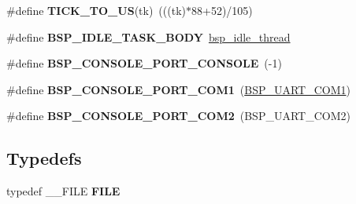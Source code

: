 \begin{DoxyCompactItemize}
\#define {\bfseries T\+I\+C\+K\+\_\+\+T\+O\+\_\+\+US}(tk)~(((tk)$\ast$88+52)/105)
\item 
\mbox{\label{group__RTEMSBSPsI386_ga4aa606d0badadcc28e8054cb60f13b56}} 
\#define {\bfseries B\+S\+P\+\_\+\+I\+D\+L\+E\+\_\+\+T\+A\+S\+K\+\_\+\+B\+O\+DY}~\mbox{\hyperlink{group__RTEMSBSPsSPARCLEON3_ga301be7085b80c41a9c5887247003c662}{bsp\+\_\+idle\+\_\+thread}}
\item 
\mbox{\label{group__RTEMSBSPsI386_gaab0a143e4bea132132a48752eed25bfb}} 
\#define {\bfseries B\+S\+P\+\_\+\+C\+O\+N\+S\+O\+L\+E\+\_\+\+P\+O\+R\+T\+\_\+\+C\+O\+N\+S\+O\+LE}~(-\/1)
\item 
\mbox{\label{group__RTEMSBSPsI386_ga522f9084a539a2ceeaa2070d41dc47a3}} 
\#define {\bfseries B\+S\+P\+\_\+\+C\+O\+N\+S\+O\+L\+E\+\_\+\+P\+O\+R\+T\+\_\+\+C\+O\+M1}~(\mbox{\hyperlink{group__i386__uart_gaa1561064cc8499388f7512347b434d25}{B\+S\+P\+\_\+\+U\+A\+R\+T\+\_\+\+C\+O\+M1}})
\item 
\mbox{\label{group__RTEMSBSPsI386_ga4c125f964575bd480c657bd5825de3f2}} 
\#define {\bfseries B\+S\+P\+\_\+\+C\+O\+N\+S\+O\+L\+E\+\_\+\+P\+O\+R\+T\+\_\+\+C\+O\+M2}~(B\+S\+P\+\_\+\+U\+A\+R\+T\+\_\+\+C\+O\+M2)
\end{DoxyCompactItemize}
\subsection*{Typedefs}
\begin{DoxyCompactItemize}
\item 
\mbox{\label{group__RTEMSBSPsI386_gaeaf27444cbf155382adcc654022bf8be}} 
typedef \+\_\+\+\_\+\+F\+I\+LE {\bfseries F\+I\+LE}
\end{DoxyCompactItemize}
